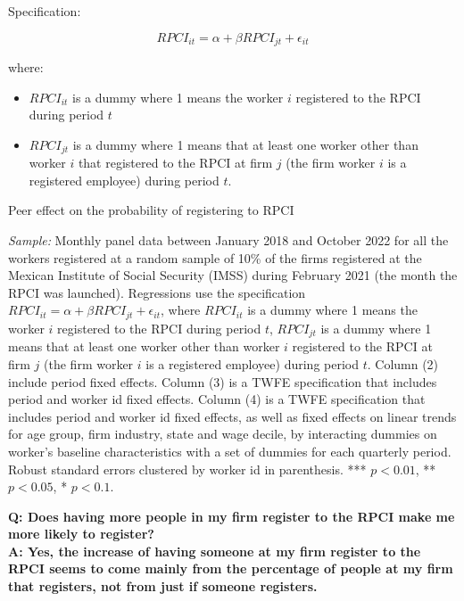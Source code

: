 \documentclass[oneside,11pt]{article}
\begin{document}
Specification:

$$RPCI_{it} = \alpha + \beta RPCI_{jt} + \epsilon_{it}$$

where:

\begin{itemize}
    \item $RPCI_{it}$ is a dummy where 1 means the worker $i$ registered to the RPCI during period $t$
    \item $RPCI_{jt}$ is a dummy where 1 means that at least one worker other than worker $i$ that registered to the RPCI at firm $j$ (the firm worker $i$ is a registered employee) during period $t$.
\end{itemize}

\begin{table}[H]
    \caption{Peer effect on the probability of registering to RPCI}
    \label{peer_rpci_rfc_rpci_dum}
    \begin{center}
    \scriptsize{}
    \end{center}
\end{table}

\scriptsize{
\noindent \textit{Sample:} Monthly panel data between January 2018 and October 2022 for all the workers registered at a random sample of 10\% of the firms registered at the Mexican Institute of Social Security (IMSS) during February 2021 (the month the RPCI was launched). Regressions use the specification $RPCI_{it} = \alpha + \beta RPCI_{jt} + \epsilon_{it}$, where $RPCI_{it}$ is a dummy where 1 means the worker $i$ registered to the RPCI during period $t$, $RPCI_{jt}$ is a dummy where 1 means that at least one worker other than worker $i$ registered to the RPCI at firm $j$ (the firm worker $i$ is a registered employee) during period $t$. Column (2) include period fixed effects. Column (3) is a TWFE specification that includes period and worker id fixed effects. Column (4) is a TWFE specification that includes period and worker id fixed effects, as well as fixed effects on linear trends for age group, firm industry, state and wage decile, by interacting dummies on worker's baseline characteristics with a set of dummies for each quarterly period. Robust standard errors clustered by worker id in parenthesis. *** $p<0.01$, ** $p<0.05$, * $p<0.1$.}

\normalsize

\clearpage

\textbf{Q: Does having more people in my firm register to the RPCI make me more likely to register?}
\\
\textbf{A: Yes, the increase of having someone at my firm register to the RPCI seems to come mainly from the percentage of people at my firm that registers, not from just if someone registers.}
\end{document}
